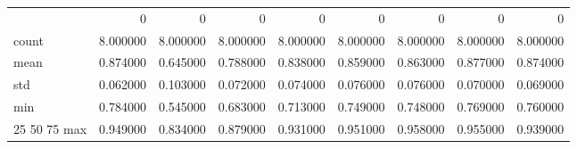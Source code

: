 \begin{tabular}{lrrrrrrrr}
 & 0 & 0 & 0 & 0 & 0 & 0 & 0 & 0 \\
count & 8.000000 & 8.000000 & 8.000000 & 8.000000 & 8.000000 & 8.000000 & 8.000000 & 8.000000 \\
mean & 0.874000 & 0.645000 & 0.788000 & 0.838000 & 0.859000 & 0.863000 & 0.877000 & 0.874000 \\
std & 0.062000 & 0.103000 & 0.072000 & 0.074000 & 0.076000 & 0.076000 & 0.070000 & 0.069000 \\
min & 0.784000 & 0.545000 & 0.683000 & 0.713000 & 0.749000 & 0.748000 & 0.769000 & 0.760000 \\
25%
50%
75%
max & 0.949000 & 0.834000 & 0.879000 & 0.931000 & 0.951000 & 0.958000 & 0.955000 & 0.939000 \\
\end{tabular}
